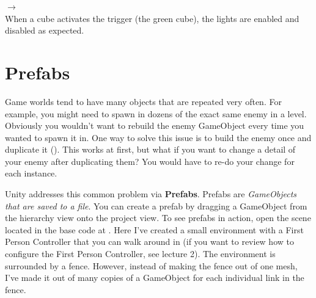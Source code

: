 \documentclass[11pt]{article}
\begin{document}
\begin{center}
 $\rightarrow$
 \\
When a cube activates the trigger (the green cube), the lights are enabled and disabled as expected.
\end{center}

\section{Prefabs}

Game worlds tend to have many objects that are repeated very often.  For example, you might need
to spawn in dozens of the exact same enemy in a level.  Obviously you wouldn't want to rebuild the
enemy GameObject every time you wanted to spawn it in.  One way to solve this issue is to build the
enemy once and duplicate it ().  This works at first, but what if you want to 
change a detail of your enemy after duplicating them?  You would have to re-do your change for each
instance.

Unity addresses this common problem via \textbf{Prefabs}.  Prefabs are \textit{GameObjects that are
saved to a file}.  You can create a prefab by dragging a GameObject from the hierarchy view onto the
project view.  To see prefabs in action, open the scene located in the base code at 
.  Here I've created a small environment
with a First Person Controller that you can walk around in (if you want to review how to configure
the First Person Controller, see lecture 2).  The environment is surrounded by a fence.  However,
instead of making the fence out of one mesh, I've made it out of many copies of a GameObject for each
individual link in the fence.
\end{document}

